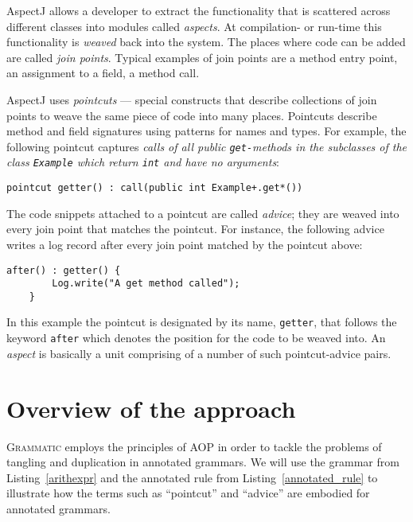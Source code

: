 \documentclass[10pt]{llncs}
\newcommand{\lstref}[1]{Listing~\ref{#1}}
\newcommand{\tool}[1]{\textsc{#1}}
\newcommand{\Grammatic}[0]{\tool{Grammatic}}
\begin{document}
AspectJ allows a developer to extract the functionality that is scattered across different classes into modules called \emph{aspects}. At compilation- or run-time this functionality is \emph{weaved} back into the system. The places where code can be added are called \emph{join points}. Typical examples of join points are a method entry point, an assignment to a field, a method call. 

AspectJ uses \emph{pointcuts} --- special constructs that describe collections of join points to weave the same piece of code into many places. Pointcuts describe method and field signatures using patterns for names and types. For example, the following pointcut captures \textit{calls of all public \texttt{get-}methods in the subclasses of the class \texttt{Example} which return \texttt{int} and have no arguments}:
\begin{lstlisting}[language={[AspectJ]Java}]
    pointcut getter() : call(public int Example+.get*())
\end{lstlisting}

The code snippets attached to a pointcut are called \emph{advice}; they are weaved into every join point that matches the pointcut. For instance, the following advice writes a log record after every join point matched by the pointcut above:
\begin{lstlisting}[language={[AspectJ]Java}]
    after() : getter() {
        Log.write("A get method called");
    }
\end{lstlisting}
In this example the pointcut is designated by its name, \texttt{getter}, that follows the keyword \texttt{after} which denotes the position for the code to be weaved into.
An \emph{aspect} is basically a unit comprising of a number of such pointcut-advice pairs.

\section{Overview of the approach}\label{Approach}

\Grammatic{} employs the principles of AOP in order to tackle the problems of tangling and duplication in annotated grammars. We will use the grammar from \lstref{arithexpr} and the annotated rule from \lstref{annotated_rule} to illustrate how the terms such as ``pointcut'' and ``advice'' are embodied for annotated grammars. 
\end{document}
